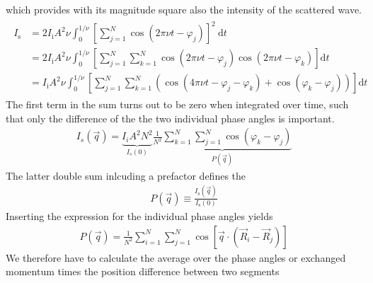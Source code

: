 \documentclass[letterpaper,10pt,english]{sphinxmanual}
\begin{document}
\sphinxAtStartPar
which provides with its magnitude square also the intensity of the scattered wave.
\begin{equation*}
\begin{split}\begin{aligned}
I_{\mathrm{s}} &=2 I_{\mathrm{i}} A^{2} \nu \int_{0}^{1 / \nu}\left[\sum_{j=1}^{N} \cos \left(2 \pi \nu t-\varphi_{j}\right)\right]^{2} \mathrm{~d} t \\
&=2 I_{\mathrm{i}} A^{2} \nu \int_{0}^{1 / \nu}\left[\sum_{j=1}^{N} \sum_{k=1}^{N} \cos \left(2 \pi \nu t-\varphi_{j}\right) \cos \left(2 \pi \nu t-\varphi_{k}\right)\right] \mathrm{d} t \\
&=I_{\mathrm{i}} A^{2} \nu \int_{0}^{1 / \nu}\left[\sum_{j=1}^{N} \sum_{k=1}^{N}\left(\cos \left(4 \pi \nu t-\varphi_{j}-\varphi_{k}\right)+\cos \left(\varphi_{k}-\varphi_{j}\right)\right)\right] \mathrm{d} t
\end{aligned}\end{split}
\end{equation*}
\sphinxAtStartPar
The first term in the sum turns out to be zero when integrated over time, such that only the difference of the the two individual phase angles is important.
\begin{equation*}
\begin{split}I_{s}(\vec{q})=\underbrace{I_{i} A^{2} N^{2}}_{I_{s}(0)} \underbrace{\frac{1}{N^{2}} \sum_{k=1}^{N} \sum_{j=1}^{N} \cos \left(\varphi_{k}-\varphi_{j}\right)}_{P(\vec{q})}\end{split}
\end{equation*}
\sphinxAtStartPar
The latter double sum inlcuding a prefactor defines the 
\begin{equation*}
\begin{split}P(\vec{q}) \equiv \frac{I_{\mathrm{s}}(\vec{q})}{I_{\mathrm{s}}(0)}\tag{form factor}\end{split}
\end{equation*}
\sphinxAtStartPar
Inserting the expression for the individual phase angles yields
\begin{equation*}
\begin{split}P(\vec{q})=\frac{1}{N^{2}} \sum_{i=1}^{N} \sum_{j=1}^{N} \cos \left[\vec{q} \cdot\left(\vec{R}_{i}-\vec{R}_{j}\right)\right]\end{split}
\end{equation*}
\sphinxAtStartPar
We therefore have to calculate the average over the phase angles or exchanged momentum times the position difference between two segments
\end{document}
